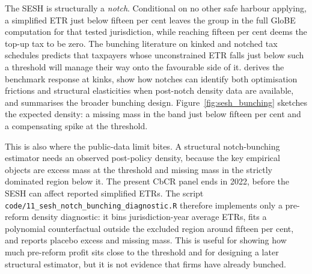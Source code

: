 \documentclass[11pt,a4paper]{article}
\begin{document}
The SESH is structurally a \emph{notch}. Conditional on no other safe harbour applying, a simplified ETR just below fifteen per cent leaves the group in the full GloBE computation for that tested jurisdiction, while reaching fifteen per cent deems the top-up tax to be zero. The bunching literature on kinked and notched tax schedules predicts that taxpayers whose unconstrained ETR falls just below such a threshold will manage their way onto the favourable side of it. \citet{saez2010} derives the benchmark response at kinks, \citet{kleven2013} show how notches can identify both optimisation frictions and structural elasticities when post-notch density data are available, and \citet{kleven2016} summarises the broader bunching design. Figure~\ref{fig:sesh_bunching} sketches the expected density: a missing mass in the band just below fifteen per cent and a compensating spike at the threshold.

This is also where the public-data limit bites. A structural notch-bunching estimator needs an observed post-policy density, because the key empirical objects are excess mass at the threshold and missing mass in the strictly dominated region below it. The present CbCR panel ends in 2022, before the SESH can affect reported simplified ETRs. The script \texttt{code/11\_sesh\_notch\_bunching\_diagnostic.R} therefore implements only a pre-reform density diagnostic: it bins jurisdiction-year average ETRs, fits a polynomial counterfactual outside the excluded region around fifteen per cent, and reports placebo excess and missing mass. This is useful for showing how much pre-reform profit sits close to the threshold and for designing a later structural estimator, but it is not evidence that firms have already bunched.
\end{document}
